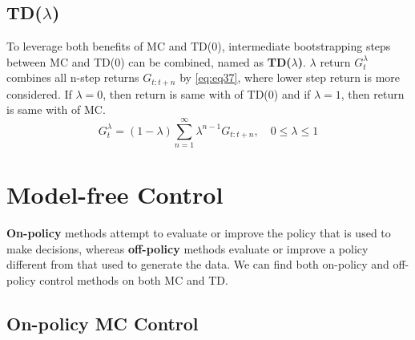 \documentclass[
	10pt, %
]{article}
\newcommand{\tb}[1]{\textbf{#1}}
\numberwithin{equation}{subsection} %
\begin{document}
\subsection{TD($\lambda$)}
To leverage both benefits of MC and TD(0), intermediate bootstrapping steps between MC and TD(0) can be combined, named as \tb{TD($\lambda$)}. $\lambda$ return $G^\lambda_t$ combines all n-step returns $G_{t:t+n}$ by \cref{eq:eq37}, where lower step return is more considered. If $\lambda = 0$, then return is same with of TD(0) and if $\lambda = 1$, then return is same with of MC.
\begin{equation} \label{eq:eq37}
    G^\lambda_t = (1-\lambda) \sum_{n=1}^\infty \lambda^{n-1}G_{t:t+n}, \quad 0 \leq \lambda \leq 1
\end{equation}


\section{Model-free Control}
\tb{On-policy} methods attempt to evaluate or improve the policy that is used to make decisions, whereas \tb{off-policy} methods evaluate or improve a policy different from that used to generate the data. We can find both on-policy and off-policy control methods on both MC and TD.
\subsection{On-policy MC Control}
\end{document}
